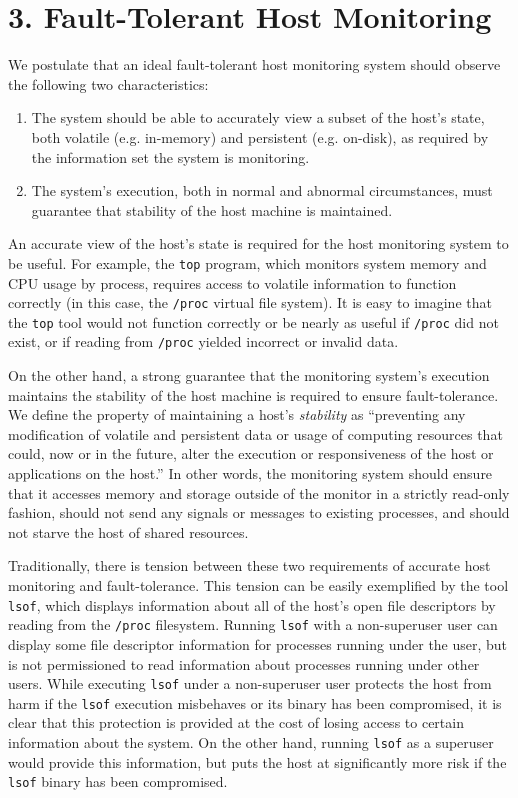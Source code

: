 \documentclass{proc}
\begin{document}
\section*{3. Fault-Tolerant Host Monitoring}

We postulate that an ideal fault-tolerant host monitoring system should observe the following two characteristics:
\begin{enumerate}
    \item The system should be able to accurately view a subset of the host's state, both volatile (e.g. in-memory) and persistent (e.g. on-disk), as required by the information set the system is monitoring.
    \item The system's execution, both in normal and abnormal circumstances, must guarantee that stability of the host machine is maintained.
\end{enumerate}

An accurate view of the host's state is required for the host monitoring system to be useful. For example, the \texttt{top} program, which monitors system memory and CPU usage by process, requires access to volatile information to function correctly (in this case, the \texttt{/proc} virtual file system). It is easy to imagine that the \texttt{top} tool would not function correctly or be nearly as useful if \texttt{/proc} did not exist, or if reading from \texttt{/proc} yielded incorrect or invalid data.

On the other hand, a strong guarantee that the monitoring system's execution maintains the stability of the host machine is required to ensure fault-tolerance. We define the property of maintaining a host's \textit{stability} as ``preventing any modification of volatile and persistent data or usage of computing resources that could, now or in the future, alter the execution or responsiveness of the host or applications on the host.'' In other words, the monitoring system should ensure that it accesses memory and storage outside of the monitor in a strictly read-only fashion, should not send any signals or messages to existing processes, and should not starve the host of shared resources.

Traditionally, there is tension between these two requirements of accurate host monitoring and fault-tolerance. This tension can be easily exemplified by the tool \texttt{lsof}, which displays information about all of the host's open file descriptors by reading from the \texttt{/proc} filesystem. Running \texttt{lsof} with a non-superuser user can display some file descriptor information for processes running under the user, but is not permissioned to read information about processes running under other users. While executing \texttt{lsof} under a non-superuser user protects the host from harm if the \texttt{lsof} execution misbehaves or its binary has been compromised, it is clear that this protection is provided at the cost of losing access to certain information about the system. On the other hand, running \texttt{lsof} as a superuser would provide this information, but puts the host at significantly more risk if the \texttt{lsof} binary has been compromised.
\end{document}
